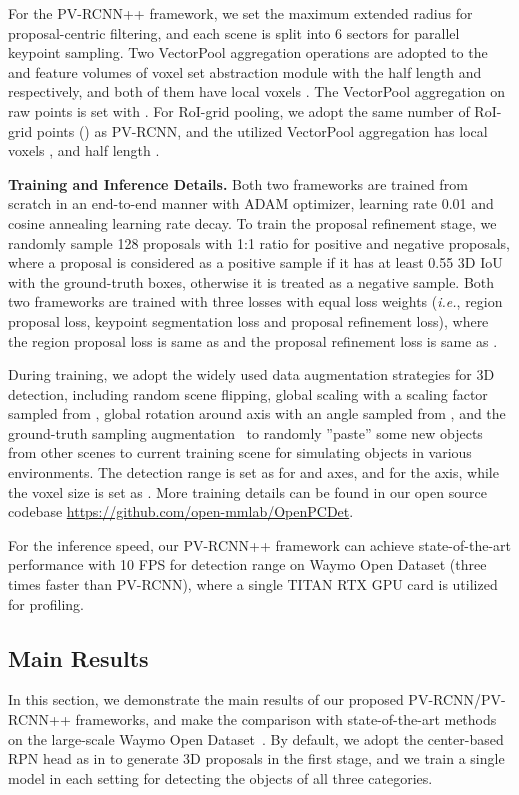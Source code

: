 \documentclass[natbib,twocolumn]{svjour3}          \smartqed  \usepackage{graphicx}
\begin{document}
For the PV-RCNN++ framework, we set the maximum extended radius  for proposal-centric filtering, and each scene is split into 6 sectors for parallel keypoint sampling. 
Two VectorPool aggregation operations are adopted to the  and  feature volumes of voxel set abstraction module with the half length  and  respectively, and both of them have local voxels .  
The VectorPool aggregation on raw points is set with . 
For RoI-grid pooling, we adopt the same number of RoI-grid points () as PV-RCNN, and the utilized VectorPool aggregation has local voxels , 
and half length . 



\noindent
\textbf{Training and Inference Details.}
Both two frameworks are trained from scratch in an end-to-end manner with ADAM optimizer, learning rate 0.01 and cosine annealing learning rate decay. To train the proposal refinement stage, we randomly sample 128 proposals with 1:1 ratio for positive and negative proposals, where a proposal is considered as a positive sample if it has at least 0.55 3D IoU with the ground-truth boxes, otherwise it is treated as a negative sample. 
Both two frameworks are trained with three losses with equal loss weights (\emph{i.e.},
region proposal loss, keypoint segmentation loss and proposal refinement loss), where the region proposal loss is same as \citep{yin2021center} and the proposal refinement loss is same as \citep{shi2020part}.


During training, we adopt the widely used data augmentation strategies for 3D detection, including random scene flipping, global scaling with a scaling factor sampled from , global rotation around  axis with an angle sampled from , and the ground-truth sampling augmentation~\citep{yan2018second} to randomly ''paste'' some new objects from other scenes to current training scene for simulating objects in various environments.
The detection range is set as  for  and  axes, and  for the  axis, while the voxel size is set as . 
More training details can be found in our open source codebase \url{https://github.com/open-mmlab/OpenPCDet}.

For the inference speed, our PV-RCNN++ framework can achieve state-of-the-art performance with 10 FPS for  detection range on Waymo Open Dataset (three times faster than PV-RCNN), where a single TITAN RTX GPU card is utilized for profiling.




\subsection{Main Results}\label{sec:main_results}
In this section, we demonstrate the main results of our proposed PV-RCNN/PV-RCNN++ frameworks, and make the comparison with state-of-the-art methods on the large-scale Waymo Open Dataset~\citep{Sun_2020_CVPR}. 
By default, we adopt the center-based RPN head as in \citep{yin2021center} to generate 3D proposals in the first stage, and we train a single model in each setting for detecting the objects of all three categories.
\end{document}
